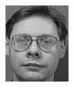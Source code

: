 \begin{frame}
\begin{columns}
\begin{overlayarea}{\textwidth}{\textheight}
\begin{minipage}[t]{0.15\textwidth}
      \end{minipage}
      \begin{minipage}[t]{0.15\textwidth}
        \includegraphics[width=\textwidth]{images/celebrity_images/s4_1.jpg}
      \end{minipage}


\end{overlayarea}
\end{columns}
\end{frame}
